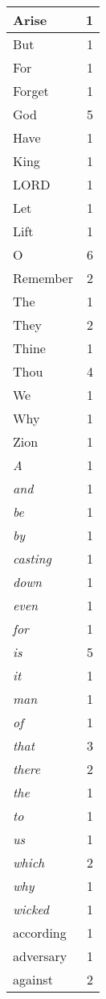 \begin{center}
\begin{longtable}{l|r}
\hline \hline
\endlastfoot
Arise & 1 \\ \hline
But & 1 \\ \hline
For & 1 \\ \hline
Forget & 1 \\ \hline
God & 5 \\ \hline
Have & 1 \\ \hline
King & 1 \\ \hline
LORD & 1 \\ \hline
Let & 1 \\ \hline
Lift & 1 \\ \hline
O & 6 \\ \hline
Remember & 2 \\ \hline
The & 1 \\ \hline
They & 2 \\ \hline
Thine & 1 \\ \hline
Thou & 4 \\ \hline
We & 1 \\ \hline
Why & 1 \\ \hline
Zion & 1 \\ \hline
\emph{A} & 1 \\ \hline
\emph{and} & 1 \\ \hline
\emph{be} & 1 \\ \hline
\emph{by} & 1 \\ \hline
\emph{casting} & 1 \\ \hline
\emph{down} & 1 \\ \hline
\emph{even} & 1 \\ \hline
\emph{for} & 1 \\ \hline
\emph{is} & 5 \\ \hline
\emph{it} & 1 \\ \hline
\emph{man} & 1 \\ \hline
\emph{of} & 1 \\ \hline
\emph{that} & 3 \\ \hline
\emph{there} & 2 \\ \hline
\emph{the} & 1 \\ \hline
\emph{to} & 1 \\ \hline
\emph{us} & 1 \\ \hline
\emph{which} & 2 \\ \hline
\emph{why} & 1 \\ \hline
\emph{wicked} & 1 \\ \hline
according & 1 \\ \hline
adversary & 1 \\ \hline
against & 2 \\ \hline

\end{longtable}
\end{center}
